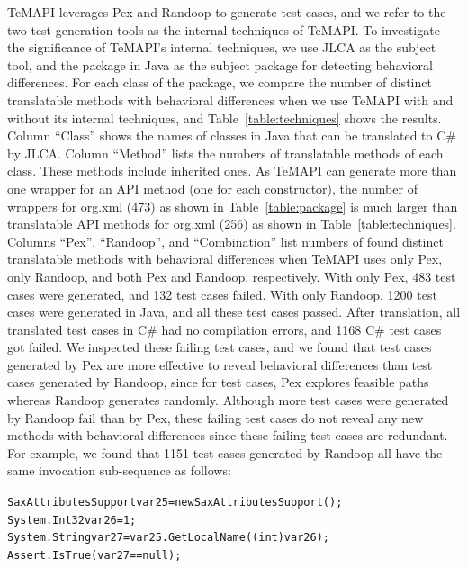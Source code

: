 TeMAPI leverages Pex and Randoop to generate test cases, and we refer to the two test-generation tools as the internal techniques of TeMAPI. To investigate the significance of TeMAPI's internal techniques, we use JLCA as the subject tool, and the  package in Java as the subject package for detecting behavioral differences. For each class of the package, we compare the number of distinct translatable methods with behavioral differences when we use TeMAPI with and without its internal techniques, and Table~\ref{table:techniques} shows the results. Column ``Class'' shows the names of classes in Java that can be translated to C\# by JLCA. Column ``Method'' lists the numbers of translatable methods of each class. These methods include inherited ones. As TeMAPI can generate more than one wrapper for an API method (one for each constructor), the number of wrappers for org.xml (473) as shown in Table~\ref{table:package} is much larger than translatable API methods for org.xml (256) as shown in Table~\ref{table:techniques}. Columns ``Pex'', ``Randoop'', and ``Combination'' list numbers of found distinct translatable methods with behavioral differences when TeMAPI uses only Pex, only Randoop, and both Pex and Randoop, respectively. With only Pex, 483 test cases were generated, and 132 test cases failed. With only Randoop, 1200 test cases were generated in Java, and all these test cases passed. After translation, all translated test cases in C\# had no compilation errors, and 1168 C\# test cases got failed. We inspected these failing test cases, and we found that test cases generated by Pex are more effective to reveal behavioral differences than test cases generated by Randoop, since for test cases, Pex explores feasible paths whereas Randoop generates randomly. Although more test cases were generated by Randoop fail than by Pex, these failing test cases do not reveal any new methods with behavioral differences since these failing test cases are redundant. For example, we found that 1151 test cases generated by Randoop all have the same invocation sub-sequence as follows:

\begin{CodeOut}%
\begin{alltt}
SaxAttributesSupport var25 = new SaxAttributesSupport();
System.Int32 var26 = 1;
System.String var27 = var25.GetLocalName((int) var26);
Assert.IsTrue(var27 == null);
\end{alltt}
\end{CodeOut}%

